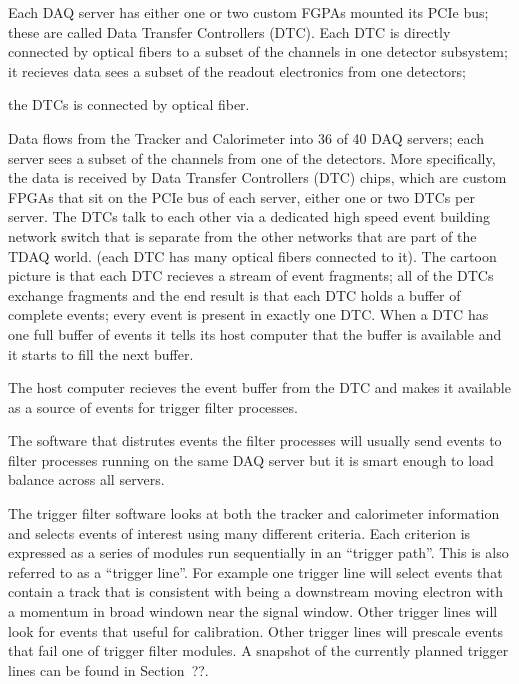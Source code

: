 %
%

Each DAQ server has either one or two custom FGPAs mounted its PCIe bus;
these are called Data Transfer Controllers (DTC).
Each DTC is directly connected by optical fibers to a subset of the channels
in one detector subsystem;
it recieves data
sees a subset of the readout electronics from one detectors;

the DTCs is connected by optical fiber.


Data flows from the Tracker and Calorimeter into 36 of 40 DAQ servers;
each server sees a subset of the channels from one of the detectors.
More specifically, the data is received by Data Transfer Controllers (DTC) chips,
which are custom FPGAs that sit on the PCIe bus of each server,
either one or two DTCs per server.
The DTCs talk to each other via a dedicated high speed event building network switch
that is separate from the other networks that are part of the TDAQ world.
(each DTC has many optical fibers connected to it).
The cartoon picture is that each DTC recieves a stream of event fragments;
all of the DTCs exchange fragments
and the end result is that each DTC holds a buffer of complete events;
every event is present in exactly one DTC.
When a DTC has one full buffer of events it tells its host computer that the buffer is
available and it starts to fill the next buffer.

The host computer recieves the event buffer from the DTC
and makes it available as a source of events for trigger filter processes.


The software that distrutes events the filter processes will usually send events
to filter processes running on the same DAQ server but it is smart enough to
load balance across all servers.

The trigger filter software looks at both the tracker and calorimeter information
and selects events of interest using many different criteria.
Each criterion is expressed as a series of \art modules run sequentially in
an \art ``trigger path''.  This is also referred to as a ``trigger line''.
For example one trigger line will select events that contain a track that is
consistent with being a downstream moving electron with a momentum in broad
windown near the signal window.  Other trigger lines will look for events
that useful for calibration.  Other trigger lines will prescale events
that fail one of trigger filter modules.  A snapshot of the currently
planned trigger lines can be found in Section~??.

